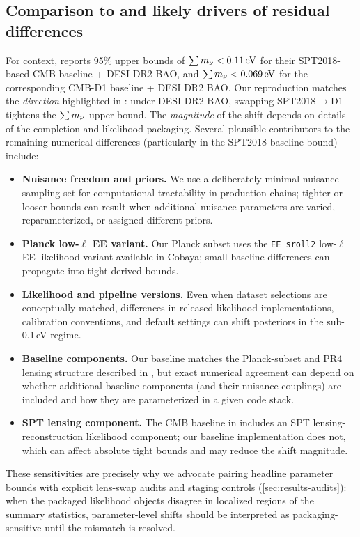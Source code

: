 \subsection{Comparison to \cite{arxiv2601_16277} and likely drivers of residual differences}
For context, \cite{arxiv2601_16277} reports 95\% upper bounds of $\sum m_\nu<0.11\,\mathrm{eV}$ for their SPT2018-based CMB baseline + DESI DR2 BAO, and $\sum m_\nu<0.069\,\mathrm{eV}$ for the corresponding CMB-D1 baseline + DESI DR2 BAO.
Our reproduction matches the \emph{direction} highlighted in \cite{arxiv2601_16277}: under DESI DR2 BAO, swapping SPT2018$\rightarrow$D1 tightens the $\sum m_\nu$ upper bound. The \emph{magnitude} of the shift depends on details of the completion and likelihood packaging. Several plausible contributors to the remaining numerical differences (particularly in the SPT2018 baseline bound) include:
\begin{itemize}[leftmargin=*, itemsep=2pt]
  \item \textbf{Nuisance freedom and priors.} We use a deliberately minimal nuisance sampling set for computational tractability in production chains; tighter or looser bounds can result when additional nuisance parameters are varied, reparameterized, or assigned different priors.
  \item \textbf{Planck low-$\ell$ EE variant.} Our Planck subset uses the \texttt{EE\_sroll2} low-$\ell$ EE likelihood variant available in Cobaya; small baseline differences can propagate into tight derived bounds.
  \item \textbf{Likelihood and pipeline versions.} Even when dataset selections are conceptually matched, differences in released likelihood implementations, calibration conventions, and default settings can shift posteriors in the sub-0.1\,eV regime.
  \item \textbf{Baseline components.} Our baseline matches the Planck-subset and PR4 lensing structure described in \cite{arxiv2601_16277}, but exact numerical agreement can depend on whether additional baseline components (and their nuisance couplings) are included and how they are parameterized in a given code stack.
  \item \textbf{SPT lensing component.} The CMB baseline in \cite{arxiv2601_16277} includes an SPT lensing-reconstruction likelihood component; our baseline implementation does not, which can affect absolute tight bounds and may reduce the shift magnitude.
\end{itemize}
These sensitivities are precisely why we advocate pairing headline parameter bounds with explicit lens-swap audits and staging controls (\cref{sec:results-audits}): when the packaged likelihood objects disagree in localized regions of the summary statistics, parameter-level shifts should be interpreted as packaging-sensitive until the mismatch is resolved.

